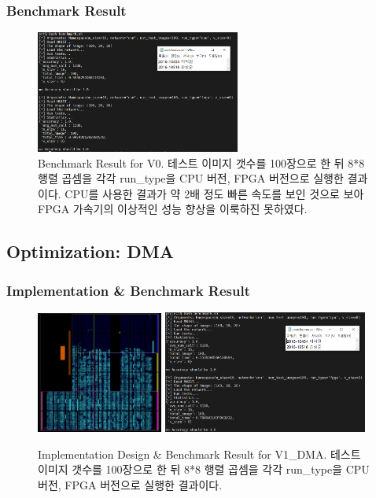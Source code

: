 \documentclass{article}
\begin{document}
\subsubsection{Benchmark Result}
\begin{figure}[htb!]
	\centering
	\includegraphics[width=0.6\textwidth]{fig/V0/benchmark.png}
\caption{Benchmark Result for V0. 테스트 이미지 갯수를 100장으로 한 뒤 8*8 행렬 곱셈을 각각 run\_type을 CPU 버전, FPGA 버전으로 실행한 결과이다. CPU를 사용한 결과가 약 2배 정도 빠른 속도를 보인 것으로 보아 FPGA 가속기의 이상적인 성능 향상을 이룩하진 못하였다. }
\label{benchmark_v0}
\end{figure}

\subsection{Optimization: DMA}
\subsubsection{Implementation \& Benchmark Result}
\begin{figure}[htb!]
	\centering
	\includegraphics[width=0.37\textwidth]{fig/V1_DMA/impl.png}
	\includegraphics[width=0.60\textwidth]{fig/V1_DMA/benchmark.png}
\caption{Implementation Design \& Benchmark Result for V1\_DMA. 테스트 이미지 갯수를 100장으로 한 뒤 8*8 행렬 곱셈을 각각 run\_type을 CPU 버전, FPGA 버전으로 실행한 결과이다. }
\label{impl_v1_dma}
\end{figure}
\end{document}
